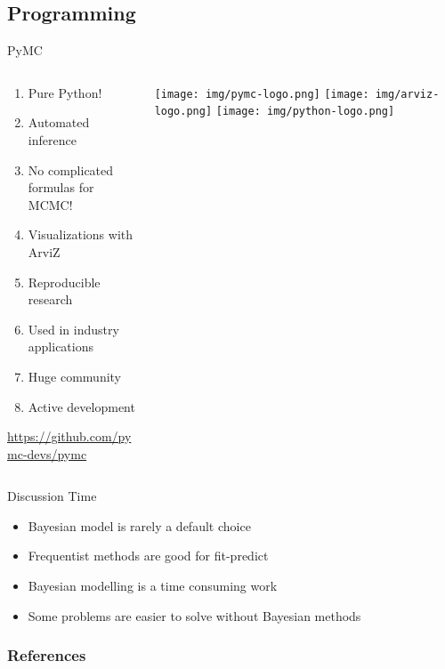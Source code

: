 \documentclass{beamer}
\begin{document}
\subsection{Programming}
\begin{frame}{PyMC}
\begin{columns}
\begin{column}{0.7\linewidth}
\begin{enumerate}
    \item Pure Python!
    \item Automated inference
    \item No complicated formulas for MCMC!
    \item Visualizations with ArviZ
    \item Reproducible research
    \item Used in industry applications
    \item Huge community
    \item Active development
\end{enumerate}
\url{https://github.com/pymc-devs/pymc}
\end{column}
\begin{column}{0.3\linewidth}
\texttt{[image: img/pymc-logo.png]}
\texttt{[image: img/arviz-logo.png]}
\texttt{[image: img/python-logo.png]}
\end{column}
\end{columns}
\end{frame}
\begin{frame}{Discussion Time}
    \begin{itemize}
        \item Bayesian model is rarely a default choice
        \item Frequentist methods are good for fit-predict
        \item Bayesian modelling is a time consuming work
        \item Some problems are easier to solve without Bayesian methods
    \end{itemize}
\end{frame}

\begin{frame}[allowframebreaks]
    \frametitle{References}
    
\end{frame}
\end{document}
